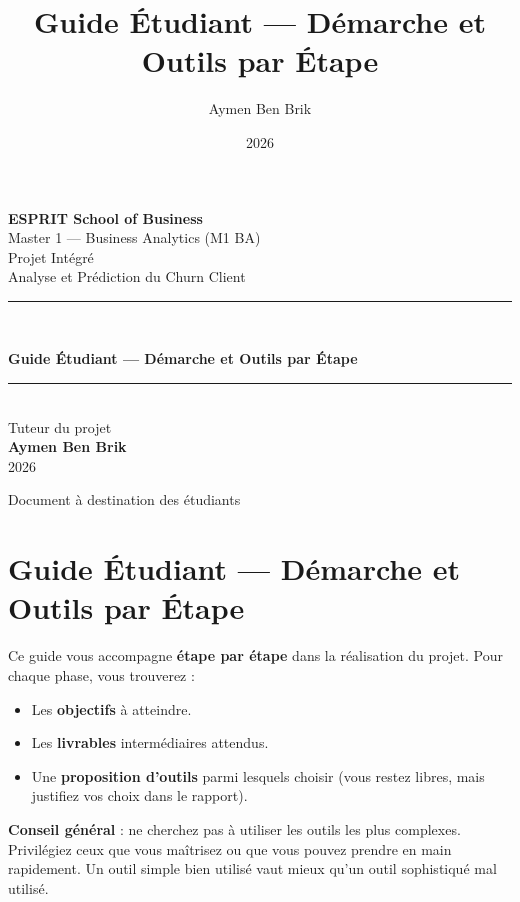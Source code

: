 \documentclass[11pt,a4paper]{article}
\title{\color{primary}\textbf{Guide Étudiant --- Démarche et Outils par
Étape}}
\author{Aymen Ben Brik}
\date{2026}
\renewenvironment{quote}{\begin{quotebox}}{\end{quotebox}}
\providecommand{\tightlist}{\setlength{\itemsep}{0pt}\setlength{\parskip}{0pt}}
\begin{document}
\begin{titlepage}
\centering
\vspace*{1.5cm}

{\Large\bfseries ESPRIT School of Business}\\[0.3cm]
{\large Master 1 --- Business Analytics (M1 BA)}\\[2cm]

{\color{gray}\large Projet Intégré}\\[0.3cm]
{\color{gray}\large Analyse et Prédiction du Churn Client}\\[2.2cm]

\rule{0.85\linewidth}{1.2pt}\\[0.6cm]
{\Huge\bfseries\color{primary} Guide Étudiant --- Démarche et Outils par
Étape\par}
\rule{0.85\linewidth}{1.2pt}\\[2cm]

{\large Tuteur du projet}\\[0.2cm]
{\Large\bfseries Aymen Ben Brik}\\[1cm]
{\large 2026}

\vfill
{\color{gray}\small Document à destination des étudiants}
\end{titlepage}

\tableofcontents
\newpage

\section{Guide Étudiant --- Démarche et Outils par
Étape}\label{guide-uxe9tudiant-duxe9marche-et-outils-par-uxe9tape}

Ce guide vous accompagne \textbf{étape par étape} dans la réalisation du
projet. Pour chaque phase, vous trouverez :

\begin{itemize}
\tightlist
\item
  Les \textbf{objectifs} à atteindre.
\item
  Les \textbf{livrables} intermédiaires attendus.
\item
  Une \textbf{proposition d'outils} parmi lesquels choisir (vous restez
  libres, mais justifiez vos choix dans le rapport).
\end{itemize}

\begin{quote}
\textbf{Conseil général} : ne cherchez pas à utiliser les outils les
plus complexes. Privilégiez ceux que vous maîtrisez ou que vous pouvez
prendre en main rapidement. Un outil simple bien utilisé vaut mieux
qu'un outil sophistiqué mal utilisé.
\end{quote}
\end{document}
